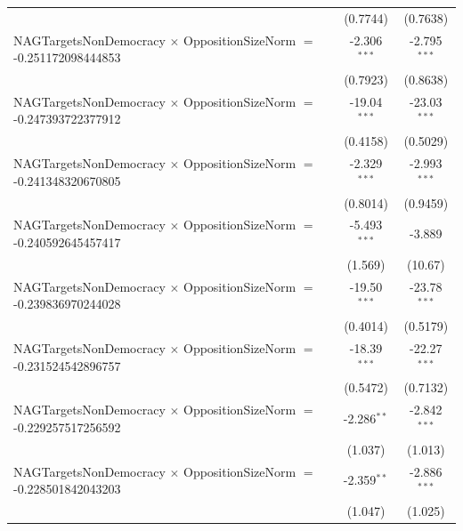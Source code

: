 \begin{tabular}{lcc}
                                                                                & (0.7744)             & (0.7638)\\   
   NAGTargetsNonDemocracy $\times$ OppositionSizeNorm $=$ -0.251172098444853    & -2.306$^{***}$       & -2.795$^{***}$\\   
                                                                                & (0.7923)             & (0.8638)\\   
   NAGTargetsNonDemocracy $\times$ OppositionSizeNorm $=$ -0.247393722377912    & -19.04$^{***}$       & -23.03$^{***}$\\   
                                                                                & (0.4158)             & (0.5029)\\   
   NAGTargetsNonDemocracy $\times$ OppositionSizeNorm $=$ -0.241348320670805    & -2.329$^{***}$       & -2.993$^{***}$\\   
                                                                                & (0.8014)             & (0.9459)\\   
   NAGTargetsNonDemocracy $\times$ OppositionSizeNorm $=$ -0.240592645457417    & -5.493$^{***}$       & -3.889\\   
                                                                                & (1.569)              & (10.67)\\   
   NAGTargetsNonDemocracy $\times$ OppositionSizeNorm $=$ -0.239836970244028    & -19.50$^{***}$       & -23.78$^{***}$\\   
                                                                                & (0.4014)             & (0.5179)\\   
   NAGTargetsNonDemocracy $\times$ OppositionSizeNorm $=$ -0.231524542896757    & -18.39$^{***}$       & -22.27$^{***}$\\   
                                                                                & (0.5472)             & (0.7132)\\   
   NAGTargetsNonDemocracy $\times$ OppositionSizeNorm $=$ -0.229257517256592    & -2.286$^{**}$        & -2.842$^{***}$\\   
                                                                                & (1.037)              & (1.013)\\   
   NAGTargetsNonDemocracy $\times$ OppositionSizeNorm $=$ -0.228501842043203    & -2.359$^{**}$        & -2.886$^{***}$\\   
                                                                                & (1.047)              & (1.025)\\   

\end{tabular}
